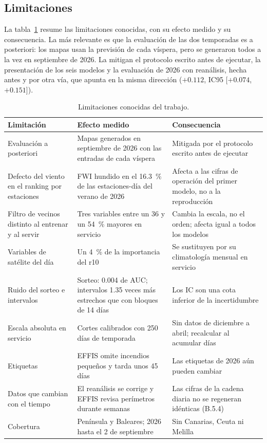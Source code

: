 \documentclass[10pt,a4paper]{article}
\begin{document}
\subsection{Limitaciones}
\label{an:b4}

La tabla~\ref{tab:limitaciones} resume las limitaciones conocidas, con su
efecto medido y su consecuencia. La más relevante es que la evaluación de las
dos temporadas es a posteriori: los mapas usan la previsión de cada víspera,
pero se generaron todos a la vez en septiembre de 2026. La mitigan el protocolo
escrito antes de ejecutar, la presentación de los seis modelos y la evaluación
de 2026 con reanálisis, hecha antes y por otra vía, que apunta en la misma
dirección ($+0.112$, IC95 [$+0.074$, $+0.151$]).

\begin{table}[H]
  \centering
  \caption{Limitaciones conocidas del trabajo.}
  \label{tab:limitaciones}
  \footnotesize
  \begin{tabular}{@{}>{\raggedright}p{3.5cm}>{\raggedright}p{6.2cm}>{\raggedright\arraybackslash}p{6.5cm}@{}}
    \toprule
    Limitación & Efecto medido & Consecuencia \\
    \midrule
    Evaluación a posteriori & Mapas generados en septiembre de 2026 con las entradas de cada víspera & Mitigada por el protocolo escrito antes de ejecutar \\
    Defecto del viento en el ranking por estaciones & FWI hundido en el 16.3~\% de las estaciones-día del verano de 2026 & Afecta a las cifras de operación del primer modelo, no a la reproducción \\
    Filtro de vecinos distinto al entrenar y al servir & Tres variables entre un 36 y un 54~\% mayores en servicio & Cambia la escala, no el orden; afecta igual a todos los modelos \\
    Variables de satélite del día & Un 4~\% de la importancia del r10 & Se sustituyen por su climatología mensual en servicio \\
    Ruido del sorteo e intervalos & Sorteo: 0.004 de AUC; intervalos 1.35 veces más estrechos que con bloques de 14 días & Los IC son una cota inferior de la incertidumbre \\
    Escala absoluta en servicio & Cortes calibrados con 250 días de temporada & Sin datos de diciembre a abril; recalcular al acumular días \\
    Etiquetas & EFFIS omite incendios pequeños y tarda unos 45 días & Las etiquetas de 2026 aún pueden cambiar \\
    Datos que cambian con el tiempo & El reanálisis se corrige y EFFIS revisa perímetros durante semanas & Las cifras de la cadena diaria no se regeneran idénticas (B.5.4) \\
    Cobertura & Península y Baleares; 2026 hasta el 2 de septiembre & Sin Canarias, Ceuta ni Melilla \\
    \bottomrule
  \end{tabular}
\end{table}
\end{document}
